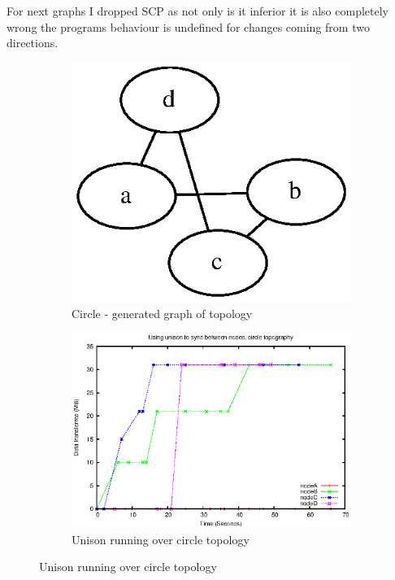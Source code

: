 \documentclass[12pt]{article}
\begin{document}
For next graphs I dropped SCP as not only is it inferior it is also
completely wrong the programs behaviour is undefined for changes
coming from two directions.
\begin{figure}[htp]
    \begin{subfigure}[b]{0.5\linewidth}
        \centering
        \includegraphics[scale=0.5]{images/circ-graph.eps}
        \caption{Circle - generated graph of topology}
        \label{fig:full_circ_graph}
    \end{subfigure}
    \begin{subfigure}[b]{0.5\linewidth}
        \centering
        \includegraphics[scale=0.5]{images/circ-uni-10-aite.eps}
        \caption{Unison running over circle topology}
        \label{fig:full_circ_uni}
    \end{subfigure}


\end{figure}
\end{document}
